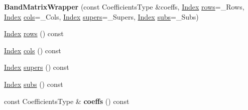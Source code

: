 \begin{DoxyCompactItemize}
\mbox{\label{class_eigen_1_1internal_1_1_band_matrix_wrapper_a1da1c6d582ee0fd5effd8290d114af62}} 
{\bfseries Band\+Matrix\+Wrapper} (const Coefficients\+Type \&coeffs, \hyperlink{group___core___module_a554f30542cc2316add4b1ea0a492ff02}{Index} \hyperlink{class_eigen_1_1internal_1_1_band_matrix_wrapper_a8d23b9d25729ac15c06591c810d13160}{rows}=\+\_\+\+Rows, \hyperlink{group___core___module_a554f30542cc2316add4b1ea0a492ff02}{Index} \hyperlink{class_eigen_1_1internal_1_1_band_matrix_wrapper_a5c81a2138f0adfb23216de383aaeeeab}{cols}=\+\_\+\+Cols, \hyperlink{group___core___module_a554f30542cc2316add4b1ea0a492ff02}{Index} \hyperlink{class_eigen_1_1internal_1_1_band_matrix_wrapper_a5e874cc43bb0b406241e3cc6042335e5}{supers}=\+\_\+\+Supers, \hyperlink{group___core___module_a554f30542cc2316add4b1ea0a492ff02}{Index} \hyperlink{class_eigen_1_1internal_1_1_band_matrix_wrapper_a146d5ceb44c93c8e0a48c207ad252a8f}{subs}=\+\_\+\+Subs)
\item 
\hyperlink{group___core___module_a554f30542cc2316add4b1ea0a492ff02}{Index} \hyperlink{class_eigen_1_1internal_1_1_band_matrix_wrapper_a8d23b9d25729ac15c06591c810d13160}{rows} () const
\item 
\hyperlink{group___core___module_a554f30542cc2316add4b1ea0a492ff02}{Index} \hyperlink{class_eigen_1_1internal_1_1_band_matrix_wrapper_a5c81a2138f0adfb23216de383aaeeeab}{cols} () const
\item 
\hyperlink{group___core___module_a554f30542cc2316add4b1ea0a492ff02}{Index} \hyperlink{class_eigen_1_1internal_1_1_band_matrix_wrapper_a5e874cc43bb0b406241e3cc6042335e5}{supers} () const
\item 
\hyperlink{group___core___module_a554f30542cc2316add4b1ea0a492ff02}{Index} \hyperlink{class_eigen_1_1internal_1_1_band_matrix_wrapper_a146d5ceb44c93c8e0a48c207ad252a8f}{subs} () const
\item 
\mbox{\label{class_eigen_1_1internal_1_1_band_matrix_wrapper_a86c85e74d144b8db575f3814e3069651}} 
const Coefficients\+Type \& {\bfseries coeffs} () const
\end{DoxyCompactItemize}
